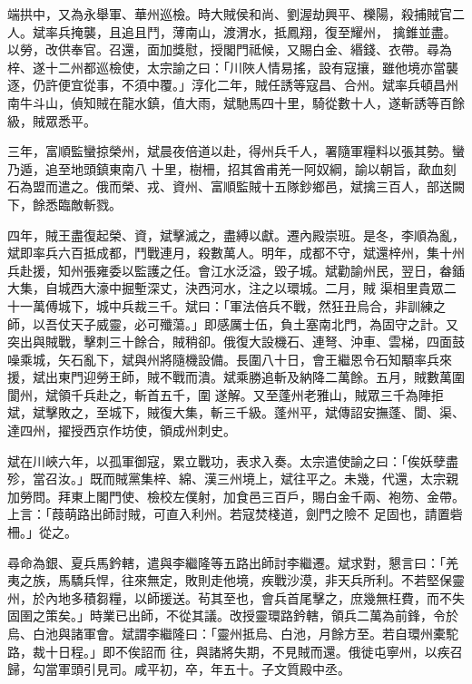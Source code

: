 \begin{pinyinscope}
 端拱中，又為永舉軍、華州巡檢。時大賊侯和尚、劉渥劫興平、櫟陽，殺捕賊官二人。斌率兵掩襲，且追且鬥，薄南山，渡渭水，抵鳳翔，復至耀州，
 擒錐並盡。以勞，改供奉官。召還，面加獎慰，授閣門祗候，又賜白金、緡錢、衣帶。尋為梓、遂十二州都巡檢使，太宗諭之曰：「川陜人情易搖，設有寇攘，雖他境亦當襲逐，仍許便宜從事，不須中覆。」淳化二年，賊任誘等寇昌、合州。斌率兵頓昌州南牛斗山，偵知賊在龍水鎮，值大雨，斌馳馬四十里，騎從數十人，遂斬誘等百餘級，賊眾悉平。



 三年，富順監蠻掠榮州，斌晨夜倍道以赴，得州兵千人，署隨軍糧料以張其勢。蠻乃遁，追至地頭鎮東南八
 十里，樹柵，招其酋甫羌一阿奴綱，諭以朝旨，歃血刻石為盟而遣之。俄而榮、戎、資州、富順監賊十五隊鈔鄉邑，斌擒三百人，部送闕下，餘悉臨敵斬戮。



 四年，賊王盡復起榮、資，斌擊滅之，盡縛以獻。遷內殿崇班。是冬，李順為亂，斌即率兵六百抵成都，鬥戰連月，殺數萬人。明年，成都不守，斌還梓州，集十州兵赴援，知州張雍委以監護之任。會江水泛溢，毀子城。斌勸諭州民，翌日，畚鍤大集，自城西大濠中掘塹深丈，決西河水，注之以環城。二月，賊
 渠相里貴眾二十一萬傅城下，城中兵裁三千。斌曰：「軍法倍兵不戰，然狂丑烏合，非訓練之師，以吾仗天子威靈，必可殲蕩。」即感厲士伍，負土塞南北門，為固守之計。又突出與賊戰，擊刺三十餘合，賊稍卻。俄復大設機石、連弩、沖車、雲梯，四面鼓噪乘城，矢石亂下，斌與州將隨機設備。長圍八十日，會王繼恩令石知顒率兵來援，斌出東門迎勞王師，賊不戰而潰。斌乘勝追斬及納降二萬餘。五月，賊數萬圍閬州，斌領千兵赴之，斬首五千，圍
 遂解。又至蓬州老雅山，賊眾三千為陣拒斌，斌擊敗之，至城下，賊復大集，斬三千級。蓬州平，斌傳詔安撫蓬、閬、渠、達四州，擢授西京作坊使，領成州刺史。



 斌在川峽六年，以孤軍御寇，累立戰功，表求入奏。太宗遣使諭之曰：「俟妖孽盡殄，當召汝。」既而賊黨集梓、綿、漢三州境上，斌往平之。未幾，代還，太宗親加勞問。拜東上閣門使、檢校左僕射，加食邑三百戶，賜白金千兩、袍笏、金帶。上言：「葭萌路出師討賊，可直入利州。若寇焚棧道，劍門之險不
 足固也，請置砦柵。」從之。



 尋命為銀、夏兵馬鈐轄，遣與李繼隆等五路出師討李繼遷。斌求對，懇言曰：「羌夷之族，馬驕兵悍，往來無定，敗則走他境，疾戰沙漠，非天兵所利。不若堅保靈州，於內地多積芻糧，以師援送。茍其至也，會兵首尾擊之，庶幾無枉費，而不失固圉之策矣。」時業已出師，不從其議。改授靈環路鈐轄，領兵二萬為前鋒，令於烏、白池與諸軍會。斌謂李繼隆曰：「靈州抵烏、白池，月餘方至。若自環州橐駝路，裁十日程。」即不俟詔而
 往，與諸將失期，不見賊而還。俄徙屯寧州，以疾召歸，勾當軍頭引見司。咸平初，卒，年五十。子文質殿中丞。




\end{pinyinscope}
